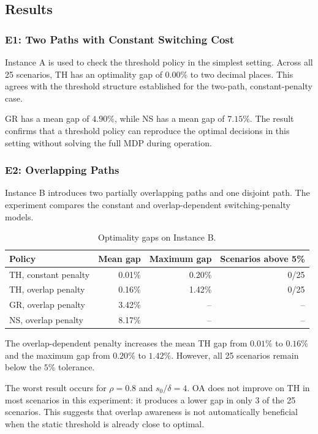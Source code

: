 \documentclass{amsart}
\begin{document}
\subsection{Results}

\subsubsection{E1: Two Paths with Constant Switching Cost}

Instance A is used to check the threshold policy in the simplest
setting. Across all 25 scenarios, TH has an optimality gap of
$0.00\%$ to two decimal places. This agrees with the threshold
structure established for the two-path, constant-penalty case.

GR has a mean gap of $4.90\%$, while NS has a mean gap of $7.15\%$.
The result confirms that a threshold policy can reproduce the
optimal decisions in this setting without solving the full MDP
during operation.

\subsubsection{E2: Overlapping Paths}

Instance B introduces two partially overlapping paths and one
disjoint path. The experiment compares the constant and
overlap-dependent switching-penalty models.

\begin{table}[ht]
\centering
\begin{tabular}{lrrr}
\hline
Policy & Mean gap & Maximum gap & Scenarios above 5\% \\
\hline
TH, constant penalty & 0.01\% & 0.20\% & 0/25 \\
TH, overlap penalty & 0.16\% & 1.42\% & 0/25 \\
GR, overlap penalty & 3.42\% & -- & -- \\
NS, overlap penalty & 8.17\% & -- & -- \\
\hline
\end{tabular}
\caption{Optimality gaps on Instance B.}
\label{tab:e2}
\end{table}

The overlap-dependent penalty increases the mean TH gap from
$0.01\%$ to $0.16\%$ and the maximum gap from $0.20\%$ to
$1.42\%$. However, all 25 scenarios remain below the $5\%$
tolerance.

The worst result occurs for $\rho=0.8$ and $s_0/\delta=4$.
OA does not improve on TH in most scenarios in this experiment:
it produces a lower gap in only 3 of the 25 scenarios. This
suggests that overlap awareness is not automatically beneficial
when the static threshold is already close to optimal.
\end{document}

